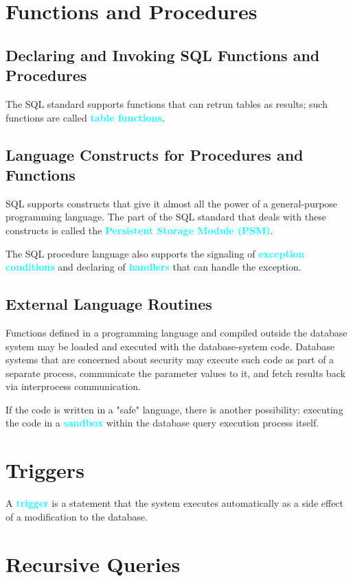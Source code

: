 \documentclass[a4paper,12pt,twoside,openany]{book}
\newcommand{\textcy}[1]{\textbf{\textcolor{cyan}{#1}}}
\begin{document}
\section{Functions and Procedures}
\subsection{Declaring and Invoking SQL Functions and Procedures}

The SQL standard supports functions that can retrun tables as results; such functions are called \textcy{table functions}.

\subsection{Language Constructs for Procedures and Functions}

SQL supports constructs that give it almost all the power of a general-purpose programming language. The part of the SQL standard that deals with these constructs is called the \textcy{Persistent Storage Module (PSM)}.

The SQL procedure language also supports the signaling of \textcy{exception conditions} and declaring of \textcy{handlers} that can handle the exception.

\subsection{External Language Routines}

Functions defined in a programming language and compiled outside the database system may be loaded and executed with the database-system code. Database systems that are concerned about security may execute such code as part of a separate process, communicate the parameter values to it, and fetch results back via interprocess communication.

If the code is written in a "safe" language, there is another possibility: executing the code in a \textcy{sandbox} within the database query execution process itself.

\section{Triggers}

A \textcy{trigger} is a statement that the system executes automatically as a side effect of a modification to the database.

\section{Recursive Queries}
\end{document}
